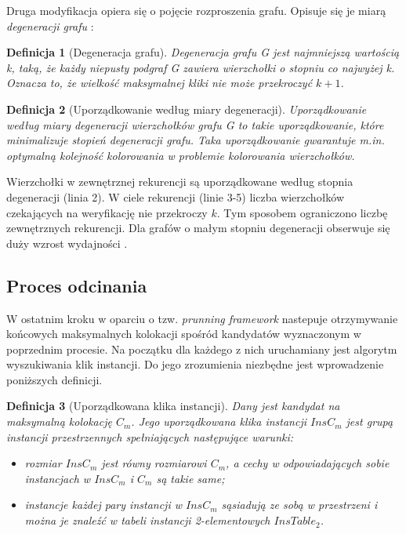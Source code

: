 \documentclass[12pt]{article}
\newtheorem{defin}{Definicja}
\begin{document}
Druga modyfikacja opiera się o pojęcie rozproszenia grafu. Opisuje się je miarą \textit{degeneracji grafu} \cite{matusiak}:
\begin{defin}[Degeneracja grafu]
Degeneracja grafu G jest najmniejszą wartością k, taką, że każdy niepusty podgraf G zawiera wierzchołki o stopniu co najwyżej k. Oznacza to, że wielkość maksymalnej kliki nie może przekroczyć $k + 1$.
\end{defin}

\begin{defin}[Uporządkowanie według miary degeneracji]
Uporządkowanie według miary degeneracji wierzchołków grafu G to takie uporządkowanie, które minimalizuje stopień degeneracji grafu. Taka uporządkowanie gwarantuje m.in. optymalną kolejność kolorowania w problemie kolorowania wierzchołków.
\end{defin}

Wierzchołki w zewnętrznej rekurencji są uporządkowane według stopnia degeneracji (linia 2). W ciele rekurencji (linie 3-5) liczba wierzchołków czekających na weryfikację nie przekroczy $ k $. Tym sposobem ograniczono liczbę zewnętrznych rekurencji. Dla grafów o małym stopniu degeneracji obserwuje się duży wzrost wydajności \cite{degenerat}.

\subsection{Proces odcinania}

W ostatnim kroku w oparciu o tzw. \textit{prunning framework} \cite{framework} nastepuje otrzymywanie końcowych maksymalnych kolokacji spośród kandydatów wyznaczonym w poprzednim procesie. Na początku dla każdego z nich uruchamiany jest algorytm wyszukiwania klik instancji. Do jego zrozumienia niezbędne jest wprowadzenie poniższych definicji.

\begin{defin}[Uporządkowana klika instancji]
Dany jest kandydat na maksymalną kolokację $ C_{m} $. Jego uporządkowana klika instancji $ InsC_{m} $ jest grupą instancji przestrzennych spełniających następujące warunki:
\begin{itemize}
\item rozmiar $ InsC_{m} $ jest równy rozmiarowi $ C_{m} $, a cechy w odpowiadających sobie instancjach w $ InsC_{m} $ i $ C_{m} $ są takie same; %
\item instancje każdej pary instancji w $ InsC_{m} $ sąsiadują ze sobą w przestrzeni i można je znaleźć w tabeli instancji 2-elementowych $ InsTable_{2} $.
\end{itemize}
\end{defin}
\end{document}

